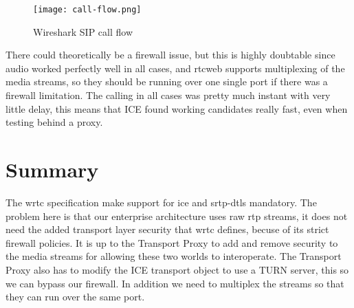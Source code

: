 \begin{figure}[here]
\centerline{\texttt{[image: call-flow.png]}}
\caption{Wireshark SIP call flow}
\label{fig:wireshark-sip-call-flow}
\end{figure}

There could theoretically be a firewall issue, but this is highly doubtable since audio worked perfectly well in all cases, and \gls{rtcweb} supports multiplexing of the media streams, so they should be running over one single port if there was a firewall limitation. The calling in all cases was pretty much instant with very little delay, this means that ICE found working candidates really fast, even when testing behind a proxy.

\section{Summary}
The \gls{wrtc} specification make support for \gls{ice} and \gls{srtp}-{dtls} mandatory. The problem here is that our enterprise architecture uses raw \gls{rtp} streams, it does not need the added transport layer security that \gls{wrtc} defines, becuse of its strict firewall policies. It is up to the Transport Proxy to add and remove security to the media streams for allowing these two worlds to interoperate. The Transport Proxy also has to modify the ICE transport object to use a TURN server, this so we can bypass our firewall. In addition we need to multiplex the streams so that they can run over the same port.